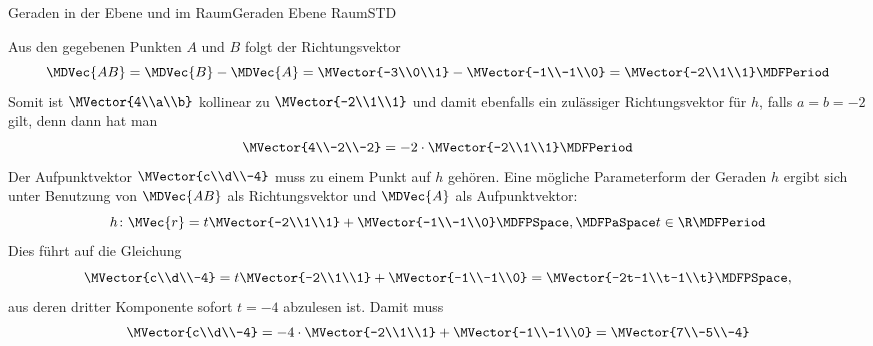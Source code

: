 \begin{MXContent}{Geraden in der Ebene und im Raum}{Geraden Ebene Raum}{STD}
\begin{MExercise}
\begin{MHint}{\iSolution}
 \begin{MExerciseItems}
\item{
Aus den gegebenen Punkten $A$ und $B$ folgt der Richtungsvektor
\[
 \MDVec{A B}=\MDVec{B}-\MDVec{A}=\MVector{-3\\0\\1}-\MVector{-1\\-1\\0}=\MVector{-2\\1\\1} \MDFPeriod
\]
Somit ist $\MVector{4\\a\\b}$ kollinear zu $\MVector{-2\\1\\1}$ und damit ebenfalls ein zulässiger Richtungsvektor für $h$, falls $a=b=-2$ gilt, denn dann hat man
\[
 \MVector{4\\-2\\-2} = -2\cdot\MVector{-2\\1\\1} \MDFPeriod
\]
Der Aufpunktvektor $\MVector{c\\d\\-4}$ muss zu einem Punkt auf $h$ gehören. Eine mögliche Parameterform der Geraden $h$ ergibt sich unter Benutzung von $\MDVec{A B}$ als Richtungsvektor und $\MDVec{A}$ als Aufpunktvektor:
\[
 h\colon\MVec{r}=t\MVector{-2\\1\\1}+\MVector{-1\\-1\\0}\MDFPSpace,\MDFPaSpace t\in\R \MDFPeriod
\]
Dies führt auf die Gleichung
\[
 \MVector{c\\d\\-4}=t\MVector{-2\\1\\1}+\MVector{-1\\-1\\0}=\MVector{-2t-1\\t-1\\t} \MDFPSpace ,
\]
aus deren dritter Komponente sofort $t=-4$ abzulesen ist. Damit muss
\[
 \MVector{c\\d\\-4}=-4\cdot\MVector{-2\\1\\1}+\MVector{-1\\-1\\0}=\MVector{7\\-5\\-4}
\]}
\end{MExerciseItems}
\end{MHint}
\end{MExercise}
\end{MXContent}
